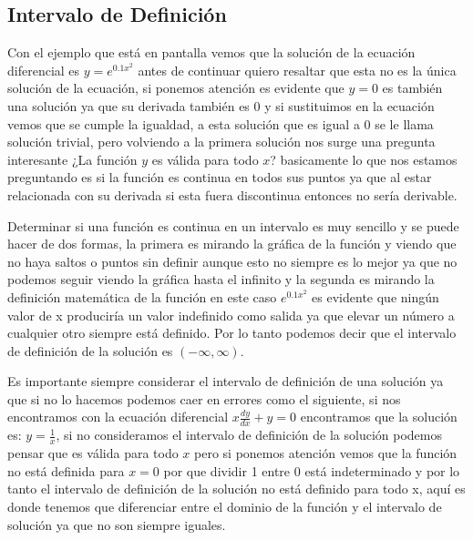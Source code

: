 \documentclass[12pt, letterpaper]{article}
\begin{document}
        \subsection{Intervalo de Definición}
            \noindent
                Con el ejemplo que está en pantalla vemos que la solución de la ecuación diferencial es $y = e^{0.1x^2}$ antes de continuar quiero resaltar que esta no es la única solución de la ecuación, si ponemos atención es evidente que $y=0$ es también una solución ya que su derivada también es 0 y si sustituimos en la ecuación vemos que se cumple la igualdad, a esta solución que es igual a 0 se le llama solución trivial, pero volviendo a la primera solución nos surge una pregunta interesante ¿La función $y$ es válida para todo $x$? basicamente lo que nos estamos preguntando es si la función es continua en todos sus puntos ya que al estar relacionada con su derivada si esta fuera discontinua entonces no sería derivable.
            \par
                Determinar si una función es continua en un intervalo es muy sencillo y se puede hacer de dos formas, la primera es mirando la gráfica de la función y viendo que no haya saltos o puntos sin definir aunque esto no siempre es lo mejor ya que no podemos seguir viendo la gráfica hasta el infinito y la segunda es mirando la definición matemática de la función en este caso $e^{0.1x^2}$ es evidente que ningún valor de x produciría un valor indefinido como salida ya que elevar un número a cualquier otro siempre está definido. Por lo tanto podemos decir que el intervalo de definición de la solución es $(-\infty, \infty)$.
            \par 
                Es importante siempre considerar el intervalo de definición de una solución ya que si no lo hacemos podemos caer en errores como el siguiente, si nos encontramos con la ecuación diferencial $x\frac{dy}{dx}+y=0$ encontramos que la solución es: $y = \frac{1}{x}$, si no consideramos el intervalo de definición de la solución podemos pensar que es válida para todo $x$ pero si ponemos atención vemos que la función no está definida para $x = 0$  por que dividir 1 entre 0 está indeterminado y por lo tanto el intervalo de definición de la solución no está definido para todo x, aquí es donde tenemos que diferenciar entre el dominio de la función y el intervalo de solución ya que no son siempre iguales.
\end{document}
